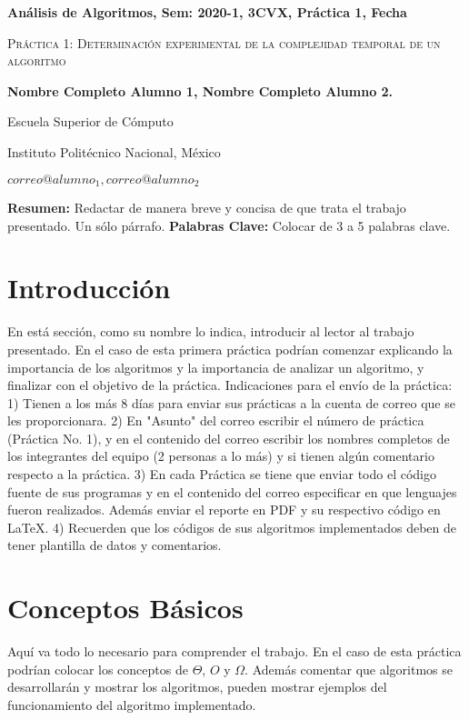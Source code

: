 \documentclass[12pt,twoside]{article}
\date{}
\begin{document}
\centerline{\bf An\'alisis de Algoritmos, Sem: 2020-1, 3CVX, Pr\'actica 1, Fecha}
\centerline{}
\centerline{}
\begin{center}
\Large{\textsc{Pr\'actica 1: Determinaci\'on experimental de la complejidad temporal de un
algoritmo}}
\end{center}
\centerline{}
\centerline{\bf {Nombre Completo Alumno 1, Nombre Completo Alumno 2.}}
\centerline{}
\centerline{Escuela Superior de C\'omputo}
\centerline{Instituto Polit\'ecnico Nacional, M\'exico}
\centerline{$correo@alumno_1, correo@alumno_2$}
\newtheorem{Theorem}{\quad Theorem}[section]
\newtheorem{Definition}[Theorem]{\quad Definition}
\newtheorem{Corollary}[Theorem]{\quad Corollary}
\newtheorem{Lemma}[Theorem]{\quad Lemma}
\newtheorem{Example}[Theorem]{\quad Example}
\bigskip
\textbf{Resumen:} Redactar de manera breve y concisa de que trata el trabajo presentado. Un
s\'olo p\'arrafo.
{\bf Palabras Clave:} Colocar de 3 a 5 palabras clave.
\section{Introducci\'on}
En est\'a secci\'on, como su nombre lo indica, introducir al lector al trabajo presentado. En el
caso de esta primera pr\'actica podr\'ian comenzar explicando la importancia de los algoritmos y
la importancia de analizar un algoritmo, y finalizar con el objetivo de la pr\'actica.
Indicaciones para el env\'io de la pr\'actica: 1) Tienen a los m\'as 8 d\'ias para enviar sus
pr\'acticas a la cuenta de correo que se les proporcionara. 2) En "Asunto" del correo escribir 
el n\'umero de pr\'actica (Pr\'actica No. 1), y en el contenido del correo escribir los nombres
completos de los integrantes del equipo (2 personas a lo m\'as) y si tienen alg\'un comentario
respecto a la pr\'actica. 3) En cada Pr\'actica se tiene que enviar todo el c\'odigo fuente de
sus programas y en el contenido del correo especificar en que lenguajes fueron realizados.
Adem\'as enviar el reporte en PDF y su respectivo c\'odigo en LaTeX. 4) Recuerden que los
c\'odigos de sus algoritmos implementados deben de tener plantilla de datos y comentarios.
\section{Conceptos B\'asicos}
Aqu\'i va todo lo necesario para comprender el trabajo. En el caso de esta pr\'actica podr\'ian
colocar los conceptos de $\Theta$, $O$ y $\Omega$. Adem\'as comentar que algoritmos se
desarrollar\'an y mostrar los algoritmos, pueden mostrar ejemplos del funcionamiento del
algoritmo implementado.
\end{document}
